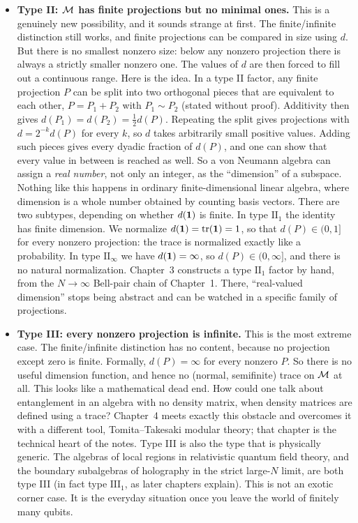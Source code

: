 \begin{itemize}
\item \textbf{Type II: $\mathcal{M}$ has finite projections but no minimal ones.} This is a genuinely new possibility,
and it sounds strange at first. The finite/infinite distinction still works, and finite projections can be
compared in size using $d$. But there is no smallest nonzero size: below any nonzero projection there is
always a strictly smaller nonzero one. The values of $d$ are then forced to fill out a continuous range. Here
is the idea. In a type II factor, any finite projection $P$ can be split into two orthogonal pieces that are
equivalent to each other, $P=P_1+P_2$ with $P_1\sim P_2$ (stated without proof). Additivity then gives
$d(P_1)=d(P_2)=\tfrac12d(P)$. Repeating the split gives projections with $d=2^{-k}d(P)$ for every $k$, so $d$
takes arbitrarily small positive values. Adding such pieces gives every dyadic fraction of $d(P)$, and one can
show that every value in between is reached as well. So a von Neumann algebra can assign a \emph{real
number}, not only an integer, as the ``dimension'' of a subspace. Nothing like this happens in ordinary
finite-dimensional linear algebra, where dimension is a whole number obtained by counting basis vectors.
There are two subtypes, depending on whether $d(\mathbf{1})$ is finite. In type $\mathrm{II}_1$ the identity has
finite dimension. We normalize $d(\mathbf{1})=\operatorname{tr}(\mathbf{1})=1$, so that $d(P)\in(0,1]$ for every nonzero projection: the
trace is normalized exactly like a probability. In type $\mathrm{II}_\infty$ we have $d(\mathbf{1})=\infty$, so
$d(P)\in(0,\infty]$, and there is no natural normalization. Chapter~3 constructs a type $\mathrm{II}_1$ factor
by hand, from the $N\to\infty$ Bell-pair chain of Chapter~1. There, ``real-valued dimension'' stops being
abstract and can be watched in a specific family of projections.

\item \textbf{Type III: every nonzero projection is infinite.} This is the most extreme case. The
finite/infinite distinction has no content, because no projection except zero is finite. Formally,
$d(P)=\infty$ for every nonzero $P$. So there is no useful dimension function, and hence no (normal,
semifinite) trace on $\mathcal{M}$ at all. This looks like a mathematical dead end. How could one talk about
entanglement in an algebra with no density matrix, when density matrices are defined using a trace?
Chapter~4 meets exactly this obstacle and overcomes it with a different tool, Tomita--Takesaki modular
theory; that chapter is the technical heart of the notes. Type III is also the type that is physically
generic. The algebras of local regions in relativistic quantum field theory, and the boundary subalgebras of
holography in the strict large-$N$ limit, are both type III (in fact type $\mathrm{III}_1$, as later chapters
explain). This is not an exotic corner case. It is the everyday situation once you leave the world of
finitely many qubits.
\end{itemize}

